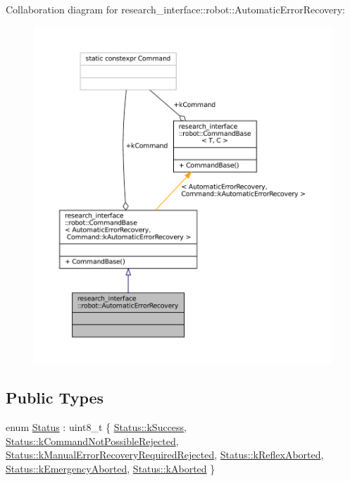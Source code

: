 Collaboration diagram for research\+\_\+interface\+:\+:robot\+:\+:Automatic\+Error\+Recovery\+:
\nopagebreak
\begin{figure}[H]
\begin{center}
\leavevmode
\includegraphics[width=350pt]{structresearch__interface_1_1robot_1_1AutomaticErrorRecovery__coll__graph}
\end{center}
\end{figure}
\subsection*{Public Types}
\begin{DoxyCompactItemize}
\item 
enum \hyperlink{structresearch__interface_1_1robot_1_1AutomaticErrorRecovery_a551f4dbc4e62d57b411344538b806adc}{Status} \+: uint8\+\_\+t \{ \newline
\hyperlink{structresearch__interface_1_1robot_1_1AutomaticErrorRecovery_a551f4dbc4e62d57b411344538b806adca8c632159fa131f09d04f94e3cbcd8782}{Status\+::k\+Success}, 
\hyperlink{structresearch__interface_1_1robot_1_1AutomaticErrorRecovery_a551f4dbc4e62d57b411344538b806adca168d00b46403240019d0b42f5a116cdd}{Status\+::k\+Command\+Not\+Possible\+Rejected}, 
\hyperlink{structresearch__interface_1_1robot_1_1AutomaticErrorRecovery_a551f4dbc4e62d57b411344538b806adca3194a60c6aa14bbe09fed9d55c44e3d2}{Status\+::k\+Manual\+Error\+Recovery\+Required\+Rejected}, 
\hyperlink{structresearch__interface_1_1robot_1_1AutomaticErrorRecovery_a551f4dbc4e62d57b411344538b806adcaedb741f9f460686f7d799eb503d047f1}{Status\+::k\+Reflex\+Aborted}, 
\newline
\hyperlink{structresearch__interface_1_1robot_1_1AutomaticErrorRecovery_a551f4dbc4e62d57b411344538b806adca452811dc518f62ba40861befb68a20cf}{Status\+::k\+Emergency\+Aborted}, 
\hyperlink{structresearch__interface_1_1robot_1_1AutomaticErrorRecovery_a551f4dbc4e62d57b411344538b806adcac20d0424ae4484fda4424713f021d736}{Status\+::k\+Aborted}
 \}
\end{DoxyCompactItemize}
